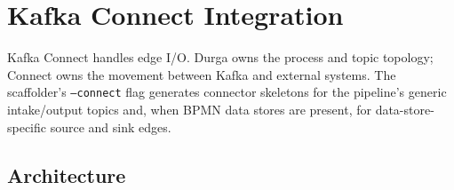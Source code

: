 \section{Kafka Connect Integration}
\label{sec:Connect}

Kafka Connect handles edge I/O. Durga owns the process and topic topology;
Connect owns the movement between Kafka and external systems. The scaffolder's
\texttt{--connect} flag generates connector skeletons for the pipeline's
generic intake/output topics and, when BPMN data stores are present, for
data-store-specific source and sink edges.

\subsection{Architecture}

